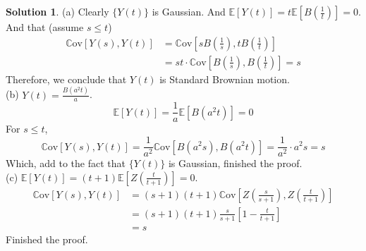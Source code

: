 \documentclass[a4paper, 10pt]{article}
\theoremstyle{definition}
\theoremstyle{hSol}
\newtheorem*{solution}{Solution}
\begin{document}
\begin{solution} (a) Clearly $\{Y(t)\}$ is Gaussian. And $\mathbb{E}\left[Y(t)\right] = t \mathbb{E}\left[B(\frac{1}{t})\right]=0$. And that (assume $s\leq t$)
\begin{equation}
  \begin{split}
    \mathrm{\mathbb{C}ov}\left[Y(s), Y(t)\right] &= \mathrm{\mathbb{C}ov}\left[sB\left(\frac{1}{s}\right), tB\left(\frac{1}{t}\right)\right] \\
    &= st \cdot \mathrm{\mathbb{C}ov}\left[B\left(\frac{1}{s}\right), B\left(\frac{1}{t}\right)\right] = s
  \end{split}
\end{equation}
Therefore, we conclude that $Y(t)$ is Standard Brownian motion. \\
(b) $Y(t)=\frac{B(a^2 t)}{a}$. 
\begin{equation}
  \mathbb{E}\left[Y(t)\right] = \frac{1}{a} \mathbb{E}\left[B(a^2t)\right] = 0
\end{equation}
For $s\leq t$, 
\begin{equation}
  \mathrm{\mathbb{C}ov}\left[Y(s), Y(t)\right] = \frac{1}{a^2}\mathrm{\mathbb{C}ov}\left[B\left(a^2 s\right), B\left(a^2 t\right)\right] = \frac{1}{a^2} \cdot a^2s = s
\end{equation}
Which, add to the fact that $\{Y(t)\}$ is Gaussian, finished the proof. \\
(c) $\mathbb{E}\left[Y(t)\right]=(t+1)\mathbb{E}\left[Z\left(\frac{t}{t+1}\right)\right]=0$.
\begin{equation}
  \begin{split}
    \mathrm{\mathbb{C}ov}\left[Y(s), Y(t)\right] &= (s+1)(t+1)\mathrm{\mathbb{C}ov}\left[Z\left(\frac{s}{s+1}\right), Z\left(\frac{t}{t+1}\right)\right] \\
    &= (s+1)(t+1)\frac{s}{s+1}\left[1-\frac{t}{t+1}\right] \\
    &= s
  \end{split}
\end{equation}
Finished the proof.
\end{solution}
\end{document}
